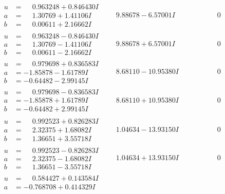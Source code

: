 \documentclass[1p]{elsarticle_modified}
\theoremstyle{definition}
\begin{document}
$$\begin{array}{c|c|c}
 \hline 
\begin{aligned}
u &= \phantom{-}0.963248 + 0.846430 I \\
a &= \phantom{-}1.30769 + 1.41106 I \\
b &= \phantom{-}0.00611 + 2.16662 I\end{aligned}
 & \phantom{-}9.88678 - 6.57001 I & \phantom{-0.000000 } 0 \\ \hline\begin{aligned}
u &= \phantom{-}0.963248 - 0.846430 I \\
a &= \phantom{-}1.30769 - 1.41106 I \\
b &= \phantom{-}0.00611 - 2.16662 I\end{aligned}
 & \phantom{-}9.88678 + 6.57001 I & \phantom{-0.000000 } 0 \\ \hline\begin{aligned}
u &= \phantom{-}0.979698 + 0.836583 I \\
a &= -1.85878 - 1.61789 I \\
b &= -0.64482 - 2.99145 I\end{aligned}
 & \phantom{-}8.68110 - 10.95380 I & \phantom{-0.000000 } 0 \\ \hline\begin{aligned}
u &= \phantom{-}0.979698 - 0.836583 I \\
a &= -1.85878 + 1.61789 I \\
b &= -0.64482 + 2.99145 I\end{aligned}
 & \phantom{-}8.68110 + 10.95380 I & \phantom{-0.000000 } 0 \\ \hline\begin{aligned}
u &= \phantom{-}0.992523 + 0.826283 I \\
a &= \phantom{-}2.32375 + 1.68082 I \\
b &= \phantom{-}1.36651 + 3.55718 I\end{aligned}
 & \phantom{-}1.04634 - 13.93150 I & \phantom{-0.000000 } 0 \\ \hline\begin{aligned}
u &= \phantom{-}0.992523 - 0.826283 I \\
a &= \phantom{-}2.32375 - 1.68082 I \\
b &= \phantom{-}1.36651 - 3.55718 I\end{aligned}
 & \phantom{-}1.04634 + 13.93150 I & \phantom{-0.000000 } 0 \\ \hline\begin{aligned}
u &= \phantom{-}0.584427 + 0.143584 I \\
a &= -0.768708 + 0.414329 I \\

\end{aligned}
\end{array}$$
\end{document}
